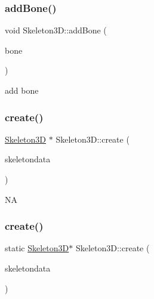 \subsubsection{\texorpdfstring{add\+Bone()}{addBone()}\hspace{0.1cm}{\footnotesize\ttfamily [2/2]}}
{\footnotesize\ttfamily void Skeleton3\+D\+::add\+Bone (\begin{DoxyParamCaption}\item[{\hyperlink{classBone3D}{Bone3D} $\ast$}]{bone }\end{DoxyParamCaption})}

add bone \mbox{\label{classSkeleton3D_a909c60d044eadf8a6a5c760c1775276b}} 
\subsubsection{\texorpdfstring{create()}{create()}\hspace{0.1cm}{\footnotesize\ttfamily [1/2]}}
{\footnotesize\ttfamily \hyperlink{classSkeleton3D}{Skeleton3D} $\ast$ Skeleton3\+D\+::create (\begin{DoxyParamCaption}\item[{const std\+::vector$<$ \hyperlink{structNodeData}{Node\+Data} $\ast$$>$ \&}]{skeletondata }\end{DoxyParamCaption})\hspace{0.3cm}{\ttfamily [static]}}

NA \mbox{\label{classSkeleton3D_ae4ac91f34067f1ddd048ff99b60bbeb2}} 
\subsubsection{\texorpdfstring{create()}{create()}\hspace{0.1cm}{\footnotesize\ttfamily [2/2]}}
{\footnotesize\ttfamily static \hyperlink{classSkeleton3D}{Skeleton3D}$\ast$ Skeleton3\+D\+::create (\begin{DoxyParamCaption}\item[{const std\+::vector$<$ \hyperlink{structNodeData}{Node\+Data} $\ast$$>$ \&}]{skeletondata }\end{DoxyParamCaption})\hspace{0.3cm}{\ttfamily [static]}}

